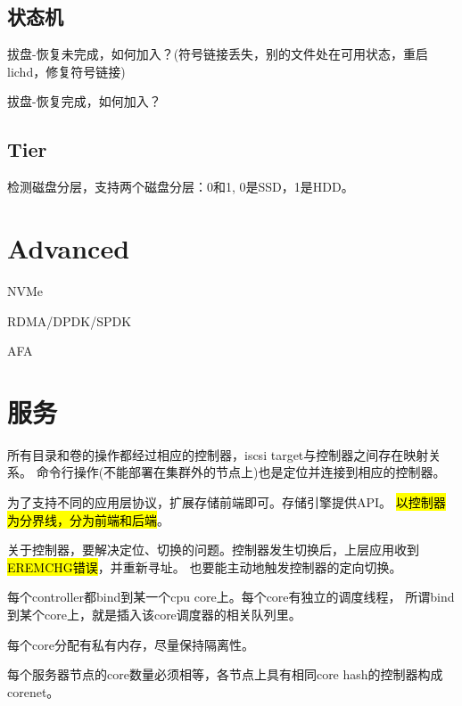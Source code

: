 \subsection{状态机}

拔盘-恢复未完成，如何加入？(符号链接丢失，别的文件处在可用状态，重启lichd，修复符号链接)

拔盘-恢复完成，如何加入？

\subsection{Tier}

检测磁盘分层，支持两个磁盘分层：0和1, 0是SSD，1是HDD。

\section{Advanced}

NVMe

RDMA/DPDK/SPDK

AFA

\section{服务}

所有目录和卷的操作都经过相应的控制器，iscsi target与控制器之间存在映射关系。
命令行操作(不能部署在集群外的节点上)也是定位并连接到相应的控制器。

为了支持不同的应用层协议，扩展存储前端即可。存储引擎提供API。
\hl{以控制器为分界线，分为前端和后端}。

关于控制器，要解决定位、切换的问题。控制器发生切换后，上层应用收到\hl{EREMCHG错误}，并重新寻址。
也要能主动地触发控制器的定向切换。

每个controller都bind到某一个cpu core上。每个core有独立的调度线程，
所谓bind到某个core上，就是插入该core调度器的相关队列里。

每个core分配有私有内存，尽量保持隔离性。

每个服务器节点的core数量必须相等，各节点上具有相同core hash的控制器构成corenet。
